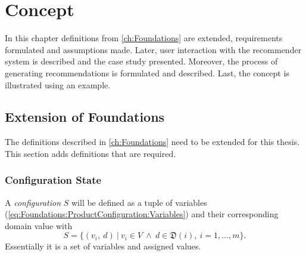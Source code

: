 \chapter{Concept}
\label{ch:Concept}

In this chapter definitions from \autoref{ch:Foundations} are extended, requirements formulated and assumptions made. Later, user interaction with the recommender system is described and the case study presented. Moreover, the process of generating recommendations is formulated and described. Last, the concept is illustrated using an example.

\section{Extension of Foundations}
\label{sec:Concept:ExtensionOfFoundations}

The definitions described in \autoref{ch:Foundations} need to be extended for this thesis. This section adds definitions that are required.

\subsection{Configuration State}

A \emph{configuration} $S$ will be defined as a tuple of variables (\autoref{eq:Foundations:ProductConfiguration:Variables}) and their corresponding domain value with
\begin{equation} \label{eq:Foundations:ProductConfiguration:ConfigurationState}
    S = \{ (v_i,\ d) \ |\ v_i \in V \ \land \ d \in \mathfrak{D}(i),\ i=1,\dotsc,m \}.
\end{equation}
Essentially it is a set of variables and assigned values.

